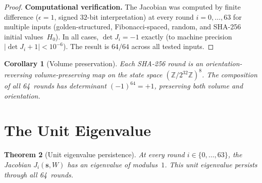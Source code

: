 \documentclass[12pt, a4paper]{article}
\theoremstyle{plain}
\newtheorem{theorem}{Theorem}[section]
\newtheorem{corollary}[theorem]{Corollary}
\theoremstyle{definition}
\newcommand{\Z}{\mathbb{Z}}
\begin{document}
\begin{proof}
\medskip
\noindent\textbf{Computational verification.}
The Jacobian was computed by finite difference
($\epsilon=1$, signed $32$-bit interpretation) at every round
$i=0,\ldots,63$ for multiple inputs (golden-structured,
Fibonacci-spaced, random, and SHA-256 initial values~$H_{0}$).
In all cases, $\det J_{i}=-1$ exactly (to machine precision
$|\det J_{i}+1|<10^{-6}$).
The result is $64/64$ across all tested inputs.
\end{proof}

\begin{corollary}[Volume preservation]\label{cor:volume}
Each SHA-256 round is an orientation-reversing volume-preserving
map on the state space $(\Z/2^{32}\Z)^{8}$.
The composition of all 64~rounds has determinant
$(-1)^{64}=+1$, preserving both volume and orientation.
\end{corollary}

\section{The Unit Eigenvalue}\label{sec:unit-eigenvalue}

\begin{theorem}[Unit eigenvalue persistence]\label{thm:unit-eigenvalue}
At every round $i\in\{0,\ldots,63\}$, the Jacobian
$J_{i}(\mathbf{s},W)$ has an eigenvalue of modulus~$1$.
This unit eigenvalue persists through all 64~rounds.
\end{theorem}
\end{document}
